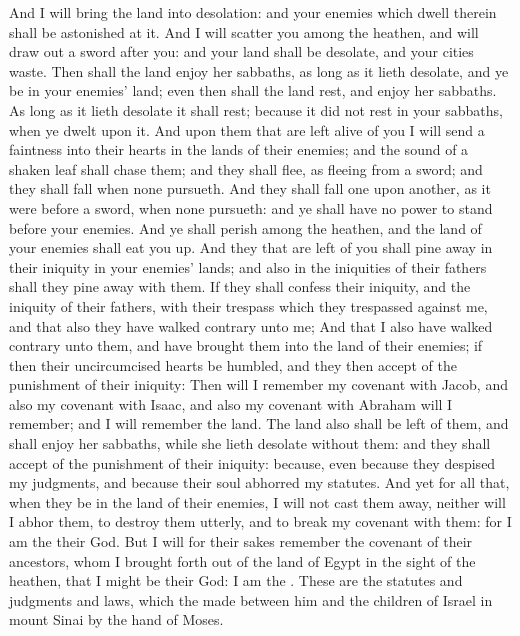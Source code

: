 \begin{biblechapter}
\verse And I will bring the land into desolation: and your enemies which dwell therein shall be astonished at it.
\verse And I will scatter you among the heathen, and will draw out a sword after you: and your land shall be desolate, and your cities waste.
\verse Then shall the land enjoy her sabbaths, as long as it lieth desolate, and ye be in your enemies' land; even then shall the land rest, and enjoy her sabbaths.
\verse As long as it lieth desolate it shall rest; because it did not rest in your sabbaths, when ye dwelt upon it.
\verse And upon them that are left alive of you I will send a faintness into their hearts in the lands of their enemies; and the sound of a shaken leaf shall chase them; and they shall flee, as fleeing from a sword; and they shall fall when none pursueth.
\verse And they shall fall one upon another, as it were before a sword, when none pursueth: and ye shall have no power to stand before your enemies.
\verse And ye shall perish among the heathen, and the land of your enemies shall eat you up.
\verse And they that are left of you shall pine away in their iniquity in your enemies' lands; and also in the iniquities of their fathers shall they pine away with them.
\verse If they shall confess their iniquity, and the iniquity of their fathers, with their trespass which they trespassed against me, and that also they have walked contrary unto me;
\verse And that I also have walked contrary unto them, and have brought them into the land of their enemies; if then their uncircumcised hearts be humbled, and they then accept of the punishment of their iniquity:
\verse Then will I remember my covenant with Jacob, and also my covenant with Isaac, and also my covenant with Abraham will I remember; and I will remember the land.
\verse The land also shall be left of them, and shall enjoy her sabbaths, while she lieth desolate without them: and they shall accept of the punishment of their iniquity: because, even because they despised my judgments, and because their soul abhorred my statutes.
\verse And yet for all that, when they be in the land of their enemies, I will not cast them away, neither will I abhor them, to destroy them utterly, and to break my covenant with them: for I am the \LORD their God.
\verse But I will for their sakes remember the covenant of their ancestors, whom I brought forth out of the land of Egypt in the sight of the heathen, that I might be their God: I am the \LORD.
\verse These are the statutes and judgments and laws, which the \LORD made between him and the children of Israel in mount Sinai by the hand of Moses.
\end{biblechapter}

